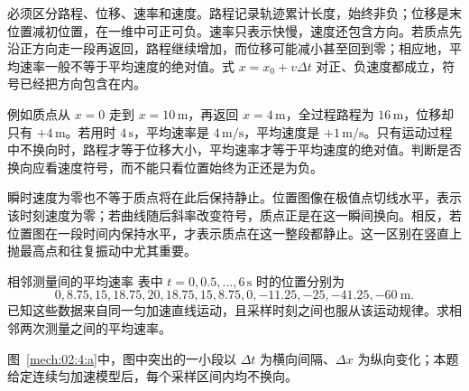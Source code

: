 {必须区分路程、位移、速率和速度。路程记录轨迹累计长度，始终非负；位移是末位置减初位置，在一维中可正可负。速率只表示快慢，速度还包含方向。若质点先沿正方向走一段再返回，路程继续增加，而位移可能减小甚至回到零；相应地，平均速率一般不等于平均速度的绝对值。式 $x=x_0+v\Delta t$ 对正、负速度都成立，符号已经把方向包含在内。

例如质点从 $x=0$ 走到 $x=10\,\mathrm m$，再返回 $x=4\,\mathrm m$，全过程路程为 $16\,\mathrm m$，位移却只有 $+4\,\mathrm m$。若用时 $4\,\mathrm s$，平均速率是 $4\,\mathrm{m/s}$，平均速度是 $+1\,\mathrm{m/s}$。只有运动过程中不换向时，路程才等于位移大小，平均速率才等于平均速度的绝对值。判断是否换向应看速度符号，而不能只看位置始终为正还是为负。

瞬时速度为零也不等于质点将在此后保持静止。位置图像在极值点切线水平，表示该时刻速度为零；若曲线随后斜率改变符号，质点正是在这一瞬间换向。相反，若位置图在一段时间内保持水平，才表示质点在这一整段都静止。这一区别在竖直上抛最高点和往复振动中尤其重要。

\begin{origexamplebox}{相邻测量间的平均速率}\label{ch02:ex:k02-2-4}
表中 $t=0,0.5,\ldots,6\,\mathrm{s}$ 时的位置分别为
\[
0,8.75,15,18.75,20,18.75,15,8.75,0,-11.25,-25,-41.25,-60\ \mathrm{m}.
\]
已知这些数据来自同一匀加速直线运动，且采样时刻之间也服从该运动规律。求相邻两次测量之间的平均速率。

\begin{qualityfigure}
\label{mech:02:4:q}
\end{qualityfigure}
\end{origexamplebox}
\begin{xesolution}
\begin{qualityfigure}
\label{mech:02:4:a}
\end{qualityfigure}
图~\ref{mech:02:4:a}中，图中突出的一小段以 $\Delta t$ 为横向间隔、$\Delta x$ 为纵向变化；本题给定连续匀加速模型后，每个采样区间内均不换向。


\end{xesolution}}
